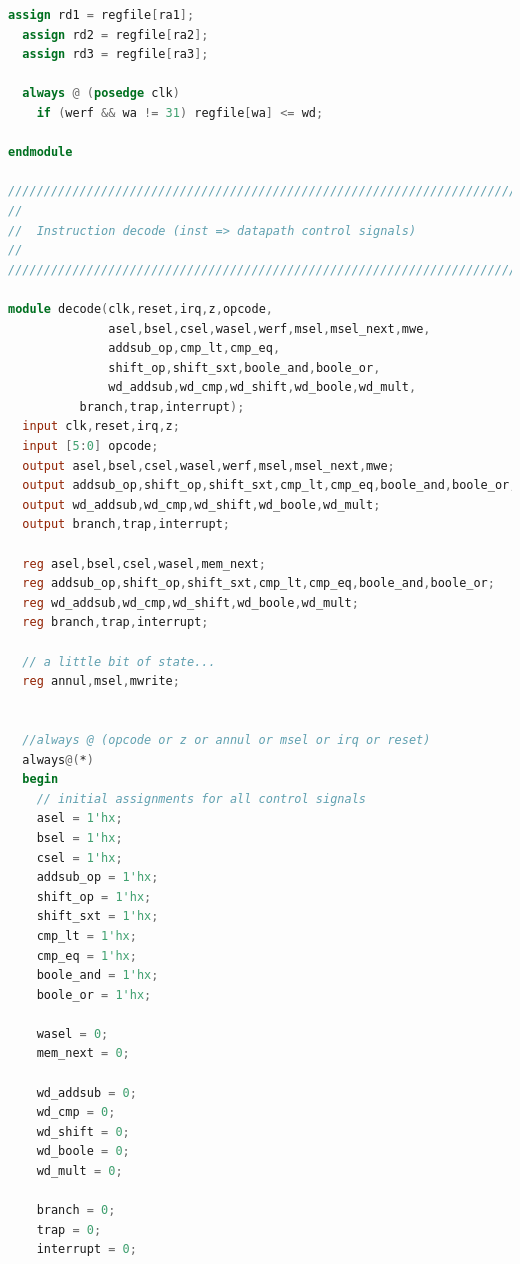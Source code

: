 \documentclass{article}
\begin{document}
\begin{lstlisting}[language=Verilog]
  assign rd1 = regfile[ra1];
  assign rd2 = regfile[ra2];
  assign rd3 = regfile[ra3];

  always @ (posedge clk)
    if (werf && wa != 31) regfile[wa] <= wd;

endmodule

///////////////////////////////////////////////////////////////////////////////
//
//	Instruction decode (inst => datapath control signals)
//
///////////////////////////////////////////////////////////////////////////////

module decode(clk,reset,irq,z,opcode,
              asel,bsel,csel,wasel,werf,msel,msel_next,mwe,
              addsub_op,cmp_lt,cmp_eq,
              shift_op,shift_sxt,boole_and,boole_or,
              wd_addsub,wd_cmp,wd_shift,wd_boole,wd_mult,
	      branch,trap,interrupt);
  input clk,reset,irq,z;
  input [5:0] opcode;
  output asel,bsel,csel,wasel,werf,msel,msel_next,mwe;
  output addsub_op,shift_op,shift_sxt,cmp_lt,cmp_eq,boole_and,boole_or;
  output wd_addsub,wd_cmp,wd_shift,wd_boole,wd_mult;
  output branch,trap,interrupt;

  reg asel,bsel,csel,wasel,mem_next;
  reg addsub_op,shift_op,shift_sxt,cmp_lt,cmp_eq,boole_and,boole_or;
  reg wd_addsub,wd_cmp,wd_shift,wd_boole,wd_mult;
  reg branch,trap,interrupt;

  // a little bit of state...
  reg annul,msel,mwrite;

  
  //always @ (opcode or z or annul or msel or irq or reset)
  always@(*)
  begin
    // initial assignments for all control signals
    asel = 1'hx;
    bsel = 1'hx;
    csel = 1'hx;
    addsub_op = 1'hx;
    shift_op = 1'hx;
    shift_sxt = 1'hx;
    cmp_lt = 1'hx;
    cmp_eq = 1'hx;
    boole_and = 1'hx;
    boole_or = 1'hx;

    wasel = 0;
    mem_next = 0;

    wd_addsub = 0;
    wd_cmp = 0;
    wd_shift = 0;
    wd_boole = 0;
    wd_mult = 0;

    branch = 0;
    trap = 0;
    interrupt = 0;


\end{lstlisting}
\end{document}
